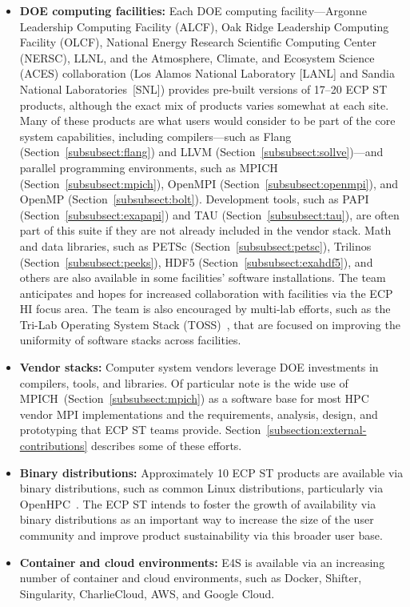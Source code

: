 \begin{itemize}
	\item \textbf{DOE computing facilities:} Each DOE computing facility---Argonne Leadership Computing Facility (ALCF), Oak Ridge Leadership Computing Facility (OLCF), National Energy Research Scientific Computing Center (NERSC), LLNL, and the Atmosphere, Climate, and Ecosystem Science (ACES) collaboration (Los Alamos National Laboratory [LANL] and Sandia National Laboratories~[SNL]) provides pre-built versions of 17--20 ECP ST products, although the exact mix of products varies somewhat at each site. Many of these products are what users would consider to be part of the core system capabilities, including compilers---such as Flang (Section~\ref{subsubsect:flang}) and LLVM (Section~\ref{subsubsect:sollve})---and parallel programming environments, such as MPICH (Section~\ref{subsubsect:mpich}), OpenMPI (Section~\ref{subsubsect:openmpi}), and OpenMP (Section~\ref{subsubsect:bolt}).  Development tools, such as PAPI (Section~\ref{subsubsect:exapapi}) and TAU (Section~\ref{subsubsect:tau}), are often part of this suite if they are not already included in the vendor stack. Math and data libraries, such as PETSc (Section~\ref{subsubsect:petsc}), Trilinos (Section~\ref{subsubsect:peeks}), HDF5 (Section~\ref{subsubsect:exahdf5}), and others are also available in some facilities' software installations. The team anticipates and hopes for increased collaboration with facilities via the ECP HI focus area.  The team is also encouraged by multi-lab efforts, such as the Tri-Lab Operating System Stack (TOSS)~\cite{TOSS}, that are focused on improving the uniformity of software stacks across facilities.
	\item \textbf{Vendor stacks:} Computer system vendors leverage DOE investments in compilers, tools, and libraries.  Of particular note is the wide use of MPICH~(Section~\ref{subsubsect:mpich}) as a software base for most HPC vendor MPI implementations and the requirements, analysis, design, and prototyping that ECP ST teams provide.  Section~\ref{subsection:external-contributions} describes some of these efforts.
	\item \textbf{Binary distributions:} Approximately 10 ECP ST products are available via binary distributions, such as common Linux distributions, particularly via OpenHPC~\cite{OpenHPC}. The ECP ST intends to foster the growth of availability via binary distributions as an important way to increase the size of the user community and improve product sustainability via this broader user base.  
	\item \textbf{Container and cloud environments:} E4S is available via an increasing number of container and cloud environments, such as Docker, Shifter, Singularity, CharlieCloud, AWS, and Google Cloud.
\end{itemize}

